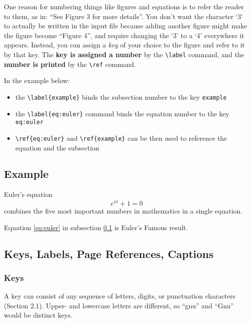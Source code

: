 \documentclass{article}
\newcommand{\justtext}[1]{\texttt{\textbackslash #1}}
\begin{document}
One reason for numbering things like figures and equations is to refer the reader to them, as in:
``See Figure 3 for more details''. You don't want the character `3' to actually be written in the
input file because adding another figure might make the figure become ``Figure 4'', and require
changing the `3' to a `4' everywhere it appears. Instead, you can assign a \emph{key} of your
choice to the figure and refer to it by that key. 
The \textbf{key is assigned a number} by the \justtext{label} command, and 
the \textbf{number is printed} by the \justtext{ref} command.

In the example below:

\begin{itemize}
   \item the \justtext{label\{example\}} binds the subsection number to the key
    {\tt example}
    
   \item the \justtext{label\{eq:euler\}} command binds the equation number to the key
    {\tt eq:euler} 
    
   \item \justtext{ref\{eq:euler\}} and \justtext{ref\{example\}} can be then used to reference the
    equation and the subsection
\end{itemize}

\subsection{Example}\label{example}

Euler's equation
\begin{equation}
   e^{i\pi} + 1 = 0 \label{eq:euler}
\end{equation}
combines the five most important numbers in mathematics in a single equation.

Equation \ref{eq:euler} in subsection \ref{example} is Euler's Famous result. 

\subsection{Keys, Labels, Page References, Captions}

\subsubsection{Keys}

A key can consist of any sequence of letters, digits, or punctuation characters (Section 2.1). 
Upper- and lowercase letters are different, so ``gnu'' and ``Gnu'' would be distinct keys. 
\end{document}

